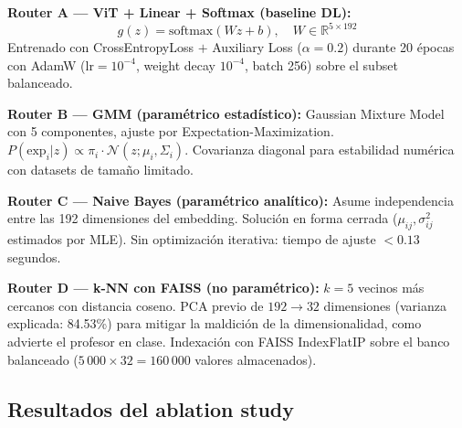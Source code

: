 \documentclass[11pt, a4paper]{article}
\begin{document}
\textbf{Router A — ViT + Linear + Softmax (baseline DL):}
\[
g(z) = \text{softmax}(W z + b), \quad W \in \mathbb{R}^{5 \times 192}
\]
Entrenado con CrossEntropyLoss $+$ Auxiliary Loss ($\alpha=0.2$) durante
20 épocas con AdamW ($\text{lr}=10^{-4}$, weight decay $10^{-4}$,
batch 256) sobre el subset balanceado.

\textbf{Router B — GMM (paramétrico estadístico):}
Gaussian Mixture Model con 5 componentes, ajuste por Expectation-Maximization.
$P(\text{exp}_i | z) \propto \pi_i \cdot \mathcal{N}(z; \mu_i, \Sigma_i)$.
Covarianza diagonal para estabilidad numérica con datasets de tamaño limitado.

\textbf{Router C — Naive Bayes (paramétrico analítico):}
Asume independencia entre las 192 dimensiones del embedding. Solución en
forma cerrada ($\mu_{ij}, \sigma^2_{ij}$ estimados por MLE). Sin optimización
iterativa: tiempo de ajuste $< 0.13$ segundos.

\textbf{Router D — k-NN con FAISS (no paramétrico):}
$k=5$ vecinos más cercanos con distancia coseno. PCA previo de
$192 \to 32$ dimensiones (varianza explicada: 84.53\%) para mitigar la
maldición de la dimensionalidad, como advierte el profesor en clase.
Indexación con FAISS IndexFlatIP sobre el banco balanceado
($5\,000 \times 32 = 160\,000$ valores almacenados).

\subsection{Resultados del ablation study}
\end{document}
